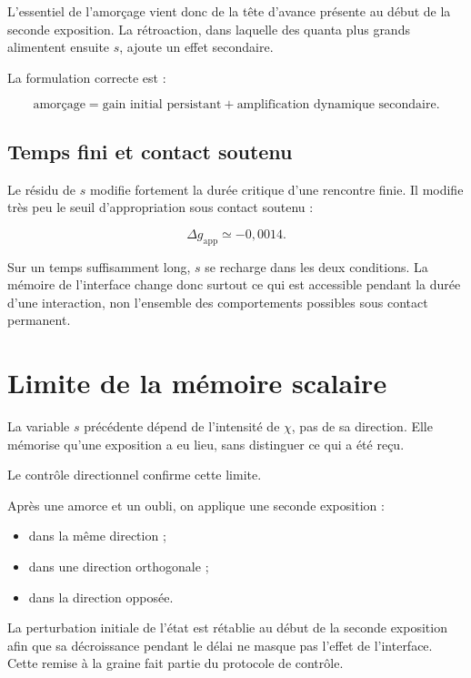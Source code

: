 L'essentiel de l'amorçage vient donc de la tête d'avance présente au
début de la seconde exposition. La rétroaction, dans laquelle des quanta
plus grands alimentent ensuite \(s\), ajoute un effet secondaire.

La formulation correcte est :

\[
\text{amorçage}
=
\text{gain initial persistant}
+
\text{amplification dynamique secondaire}.
\]

\section{Temps fini et contact soutenu}\label{t2-temps-fini-et-contact-soutenu}

Le résidu de \(s\) modifie fortement la durée critique d'une rencontre
finie. Il modifie très peu le seuil d'appropriation sous contact soutenu
:

\[
\Delta g_{\mathrm{app}}\simeq-0{,}0014.
\]

Sur un temps suffisamment long, \(s\) se recharge dans les deux
conditions. La mémoire de l'interface change donc surtout ce qui est
accessible pendant la durée d'une interaction, non l'ensemble des
comportements possibles sous contact permanent.

\chapter{Limite de la mémoire scalaire}\label{t2-limite-de-la-memoire-scalaire}

La variable \(s\) précédente dépend de l'intensité de \(\chi\), pas de
sa direction. Elle mémorise qu'une exposition a eu lieu, sans distinguer
ce qui a été reçu.

Le contrôle directionnel confirme cette limite.

Après une amorce et un oubli, on applique une seconde exposition :

\begin{itemize}
\tightlist
\item
  dans la même direction ;
\item
  dans une direction orthogonale ;
\item
  dans la direction opposée.
\end{itemize}

La perturbation initiale de l'état est rétablie au début de la seconde exposition afin que sa décroissance pendant le délai ne masque pas l'effet de l'interface. Cette remise à la graine fait partie du protocole de contrôle.

